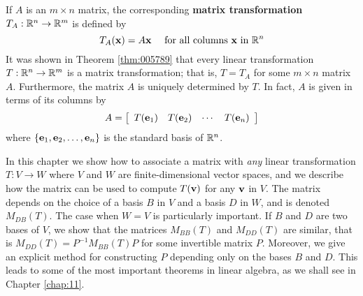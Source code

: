 \noindent If $A$ is an $m \times n$ matrix, the corresponding \textbf{matrix transformation} $T_A : \mathbb{R}^n \to \mathbb{R}^m$ is defined by 
\begin{equation*}
T_A (\textbf{x}) = A \textbf{x} \quad \mbox{ for all columns } \textbf{x} \mbox{ in } \mathbb{R}^n
\end{equation*}
It was shown in Theorem \ref{thm:005789} that every linear transformation $T : \mathbb{R}^n \to \mathbb{R}^m$ is a matrix transformation; that is, $T = T_A$ for some $m \times n$ matrix $A$. Furthermore, the matrix $A$ is uniquely determined by $T$. In fact, $A$ is given in terms of its columns by
\begin{equation*}
A = \left[ \begin{array}{cccc}
T(\textbf{e}_1) & T(\textbf{e}_2) & \cdots & T(\textbf{e}_n) 
\end{array}\right]
\end{equation*}
where $\{\textbf{e}_1, \textbf{e}_2, \dots, \textbf{e}_n\}$ is the standard basis of $\mathbb{R}^n$. 

In this chapter we show how to associate a matrix with \textit{any} linear transformation $T : V \to W$ where $V$ and $W$ are finite-dimensional vector spaces, and we describe how the matrix can be used to compute $T(\textbf{v})$ for any $\textbf{v}$ in $V$. The matrix depends on the choice of a basis $B$ in $V$ and a basis $D$ in $W$, and is denoted $M_{DB}(T)$. The case when $W = V$ is particularly important. If $B$ and $D$ are two bases of $V$, we show that the matrices $M_{BB}(T)$ and $M_{DD}(T)$ are similar, that is $M_{DD}(T) = P^{-1}M_{BB}(T)P$ for some invertible matrix $P$. Moreover, we give an explicit method for constructing $P$ depending only on the bases $B$ and $D$. This leads to some of the most important theorems in linear algebra, as we shall see in Chapter \ref{chap:11}.
